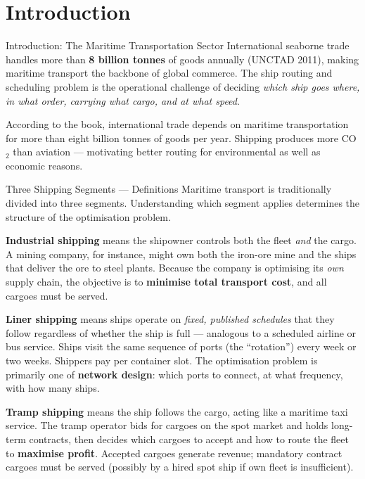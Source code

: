 \documentclass[aspectratio=169,10pt]{beamer}
\begin{document}
\section{Introduction}

\begin{frame}[allowframebreaks]{Introduction: The Maritime Transportation Sector}
  International seaborne trade handles more than \textbf{8 billion tonnes} of
  goods annually (UNCTAD 2011), making maritime transport the backbone of
  global commerce.  The ship routing and scheduling problem is the operational
  challenge of deciding \emph{which ship goes where, in what order, carrying
  what cargo, and at what speed}.

  \medskip
  According to the book, international trade depends on maritime transportation
  for more than eight billion tonnes of goods per year.  Shipping produces more
  CO$_2$ than aviation --- motivating better routing for environmental as well
  as economic reasons.

  \medskip
  \begin{block}{Three Shipping Segments --- Definitions}
    Maritime transport is traditionally divided into three segments.
    Understanding which segment applies determines the structure of the
    optimisation problem.

    \textbf{Industrial shipping} means the shipowner controls both the
    fleet \emph{and} the cargo.  A mining company, for instance, might own both
    the iron-ore mine and the ships that deliver the ore to steel plants.
    Because the company is optimising its \emph{own} supply chain, the
    objective is to \textbf{minimise total transport cost}, and all cargoes
    must be served.

    \textbf{Liner shipping} means ships operate on \emph{fixed, published
    schedules} that they follow regardless of whether the ship is full ---
    analogous to a scheduled airline or bus service.  Ships visit the same
    sequence of ports (the ``rotation'') every week or two weeks.  Shippers
    pay per container slot.  The optimisation problem is primarily one of
    \textbf{network design}: which ports to connect, at what frequency, with
    how many ships.

    \textbf{Tramp shipping} means the ship follows the cargo, acting like a
    maritime taxi service.  The tramp operator bids for cargoes on the spot
    market and holds long-term contracts, then decides which cargoes to accept
    and how to route the fleet to \textbf{maximise profit}.  Accepted cargoes
    generate revenue; mandatory contract cargoes must be served (possibly by
    a hired spot ship if own fleet is insufficient).
  \end{block}


\end{frame}
\end{document}
